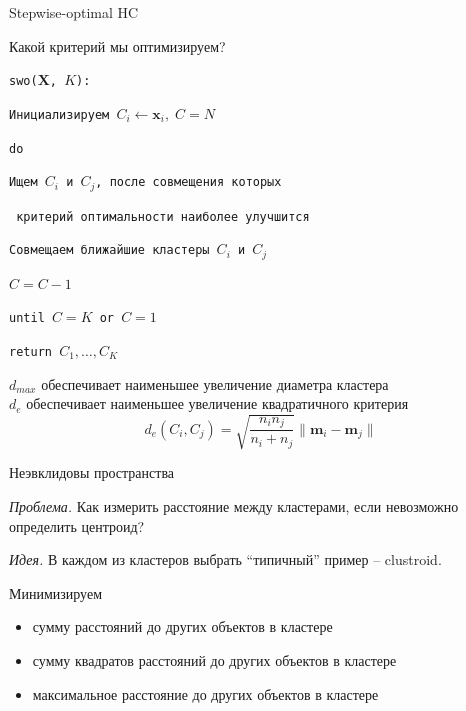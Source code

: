 \documentclass[10pt,a4paper]{beamer}
\begin{document}

\begin{frame}{Stepwise-optimal HC}

Какой критерий мы оптимизируем?

\vspace{1em}
\texttt{swo($\mathbf{X}$, $K$):}

\texttt{\quad Инициализируем $C_i \leftarrow \mathbf{x}_i,\; C = N$}

\texttt{\quad do}

\texttt{\quad\quad Ищем $C_i$ и $C_j$, после совмещения которых }

\texttt{\quad\quad\;\; критерий оптимальности наиболее улучшится}

\texttt{\quad\quad Совмещаем ближайшие кластеры $C_i$ и $C_j$}

\texttt{\quad\quad $C = C - 1$}

\texttt{\quad until $C = K$ or $C = 1$}

\texttt{\quad return $C_1, \ldots, C_K$}

\vspace{1em}
$d_{max}$ обеспечивает наименьшее увеличение диаметра кластера \\
$d_e$ обеспечивает наименьшее увеличение квадратичного критерия
\[
d_e(C_i, C_j) = \sqrt{\frac{n_i n_j}{n_i + n_j}} \|\mathbf{m}_i -\mathbf{m}_j \|
\]

\end{frame}


\begin{frame}{Неэвклидовы пространства}

{\it Проблема. } Как измерить расстояние между кластерами, если невозможно определить центроид?

\vspace{1em}
{\it Идея. } В каждом из кластеров выбрать ``типичный'' пример -- clustroid.

\vspace{1em}
Минимизируем
\begin{itemize}
\item сумму расстояний до других объектов в кластере
\item сумму квадратов расстояний до других объектов в кластере
\item максимальное расстояние до других объектов в кластере
\end{itemize}

\end{frame}
\end{document}
